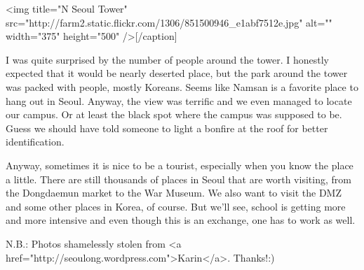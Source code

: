 \begin{post}
\begin{content}
[caption id="" align="aligncenter" width="375" caption="N Seoul Tower — via flickr"]<img title="N Seoul Tower" src="http://farm2.static.flickr.com/1306/851500946_e1abf7512e.jpg" alt="" width="375" height="500" />[/caption]



I was quite surprised by the number of people around the tower. I honestly expected that it would be nearly deserted place, but the park around the tower was packed with people, mostly Koreans. Seems like Namsan is a favorite place to hang out in Seoul. Anyway, the view was terrific and we even managed to locate our campus. Or at least the black spot where the campus was supposed to be. Guess we should have told someone to light a bonfire at the roof for better identification.



Anyway, sometimes it is nice to be a tourist, especially when you know the place a little. There are still thousands of places in Seoul that are worth visiting, from the Dongdaemun market to the War Museum. We also want to visit the DMZ and some other places in Korea, of course. But we'll see, school is getting more and more intensive and even though this is an exchange, one has to work as well.



N.B.: Photos shamelessly stolen from <a href="http://seoulong.wordpress.com">Karin</a>. Thanks!:)
	\end{content}
\end{post}
